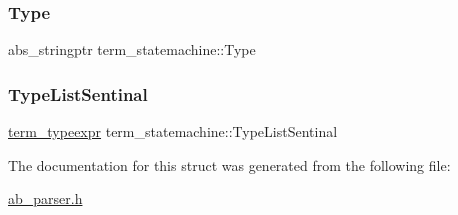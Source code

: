 \mbox{\label{structterm__statemachine_abec84e1fd19f32bad850cbbfeb8c187c}} 
\subsubsection{\texorpdfstring{Type}{Type}}
{\footnotesize\ttfamily abs\+\_\+stringptr term\+\_\+statemachine\+::\+Type}

\mbox{\label{structterm__statemachine_ababd4f7bc69e5ca15fe95a56cdb312af}} 
\subsubsection{\texorpdfstring{Type\+List\+Sentinal}{TypeListSentinal}}
{\footnotesize\ttfamily \hyperlink{structterm__typeexpr}{term\+\_\+typeexpr} term\+\_\+statemachine\+::\+Type\+List\+Sentinal}



The documentation for this struct was generated from the following file\+:\begin{DoxyCompactItemize}
\item 
\hyperlink{ab__parser_8h}{ab\+\_\+parser.\+h}\end{DoxyCompactItemize}
